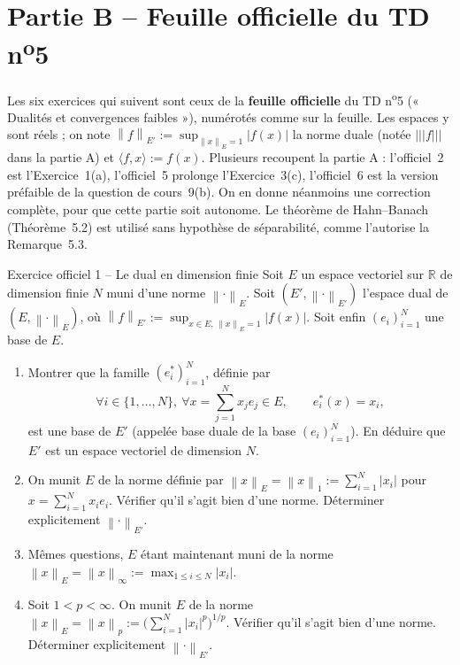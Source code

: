 \documentclass[11pt,a4paper]{article}
\newcommand{\R}{\mathbb{R}}
\newcommand{\norm}[1]{\left\|#1\right\|}
\newcommand{\opnorm}[1]{|\!|\!|#1|\!|\!|}
\theoremstyle{definition}
\begin{document}
\section*{Partie B -- Feuille officielle du TD n\textsuperscript{o}5}

\begin{commentaire}
Les six exercices qui suivent sont ceux de la \textbf{feuille officielle} du TD n\textsuperscript{o}5 (« Dualités et convergences faibles »), numérotés comme sur la feuille. Les espaces y sont réels ; on note $\norm f_{E'}:=\sup_{\norm x_E=1}|f(x)|$ la norme duale (notée $\opnorm f$ dans la partie A) et $\langle f,x\rangle:=f(x)$. Plusieurs recoupent la partie A : l'officiel~2 est l'Exercice~1(a), l'officiel~5 prolonge l'Exercice~3(c), l'officiel~6 est la version préfaible de la question de cours~9(b). On en donne néanmoins une correction complète, pour que cette partie soit autonome. Le théorème de Hahn--Banach (Théorème~5.2) est utilisé sans hypothèse de séparabilité, comme l'autorise la Remarque~5.3.
\end{commentaire}

\begin{exo}{Exercice officiel 1 -- Le dual en dimension finie}
Soit $E$ un espace vectoriel sur $\R$ de dimension finie $N$ muni d'une norme $\norm\cdot_E$. Soit $(E',\norm\cdot_{E'})$ l'espace dual de $(E,\norm\cdot_E)$, où $\norm f_{E'}:=\sup_{x\in E,\,\norm x_E=1}|f(x)|$. Soit enfin $(e_i)_{i=1}^N$ une base de $E$.
\begin{enumerate}[label=(\alph*)]
  \item Montrer que la famille $(e_i^*)_{i=1}^N$, définie par
  \[
  \forall i\in\{1,\dots,N\},\ \forall x=\sum_{j=1}^Nx_je_j\in E,\qquad e_i^*(x)=x_i,
  \]
  est une base de $E'$ (appelée base duale de la base $(e_i)_{i=1}^N$). En déduire que $E'$ est un espace vectoriel de dimension $N$.
  \item On munit $E$ de la norme définie par $\norm x_E=\norm x_1:=\sum_{i=1}^N|x_i|$ pour $x=\sum_{i=1}^Nx_ie_i$. Vérifier qu'il s'agit bien d'une norme. Déterminer explicitement $\norm\cdot_{E'}$.
  \item Mêmes questions, $E$ étant maintenant muni de la norme $\norm x_E=\norm x_\infty:=\max_{1\le i\le N}|x_i|$.
  \item Soit $1<p<\infty$. On munit $E$ de la norme $\norm x_E=\norm x_p:=\big(\sum_{i=1}^N|x_i|^p\big)^{1/p}$. Vérifier qu'il s'agit bien d'une norme. Déterminer explicitement $\norm\cdot_{E'}$.
\end{enumerate}
\end{exo}
\end{document}
